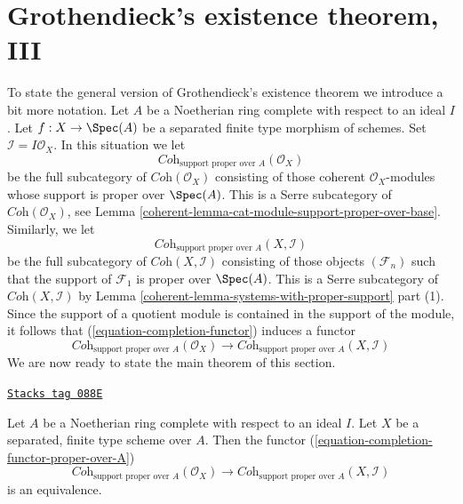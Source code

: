 \section{Grothendieck's existence theorem, III}
\label{coherent-section-existence-proper-support}
To state the general version of Grothendieck's existence theorem
we introduce a bit more notation. Let $A$ be a Noetherian ring
complete with respect to an ideal $I$. Let $f : X \to \Spec(A)$
be a separated finite type morphism of schemes. Set
$\mathcal{I} = I\mathcal{O}_X$. In this situation we let
$$
\textit{Coh}_{\text{support proper over } A}(\mathcal{O}_X)
$$
be the full subcategory of $\textit{Coh}(\mathcal{O}_X)$
consisting of those coherent $\mathcal{O}_X$-modules whose
support is proper over $\Spec(A)$. This is a Serre subcategory of
$\textit{Coh}(\mathcal{O}_X)$, see
Lemma \ref{coherent-lemma-cat-module-support-proper-over-base}.
Similarly, we let
$$
\textit{Coh}_{\text{support proper over } A}(X, \mathcal{I})
$$
be the full subcategory of $\textit{Coh}(X, \mathcal{I})$
consisting of those objects $(\mathcal{F}_n)$ such that
the support of $\mathcal{F}_1$ is proper over $\Spec(A)$.
This is a Serre subcategory of $\textit{Coh}(X, \mathcal{I})$
by Lemma \ref{coherent-lemma-systems-with-proper-support} part (1).
Since the support of a quotient module is contained in the support
of the module, it follows that (\ref{equation-completion-functor})
induces a functor
\begin{equation}
\label{equation-completion-functor-proper-over-A}
\textit{Coh}_{\text{support proper over }A}(\mathcal{O}_X)
\longrightarrow
\textit{Coh}_{\text{support proper over }A}(X, \mathcal{I})
\end{equation}
We are now ready to state the main theorem of this section.

\begin{theorem}

\label{coherent-theorem-grothendieck-existence}
\href{https://stacks.math.columbia.edu/tag/088E}{\texttt{Stacks tag 088E}}

\begin{reference}
\cite[III Theorem 5.1.5]{EGA}
\end{reference}
Let $A$ be a Noetherian ring complete with respect to an ideal $I$.
Let $X$ be a separated, finite type scheme over $A$. Then
the functor
(\ref{equation-completion-functor-proper-over-A})
$$
\textit{Coh}_{\text{support proper over }A}(\mathcal{O}_X)
\longrightarrow
\textit{Coh}_{\text{support proper over }A}(X, \mathcal{I})
$$
is an equivalence.
\end{theorem}


